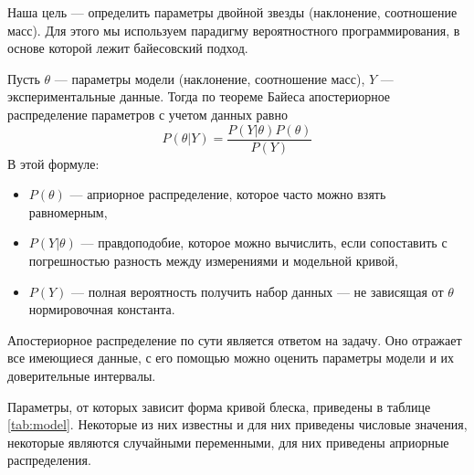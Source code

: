 






Наша цель --- определить параметры двойной звезды (наклонение, соотношение масс). Для этого мы используем парадигму вероятностного программирования, в основе которой лежит байесовский подход.

Пусть $\theta$ --- параметры модели (наклонение, соотношение масс), $Y$ --- экспериментальные данные. Тогда по теореме Байеса апостериорное распределение параметров с учетом данных равно
\begin{equation}
P(\theta | Y) = \frac{P(Y | \theta) P(\theta)}{P(Y)}
\label{eq:bayes}
\end{equation}
В этой формуле:
\begin{itemize}
    \item $P(\theta)$ --- априорное распределение, которое часто можно взять равномерным,
    \item $P(Y | \theta)$ --- правдоподобие, которое можно вычислить, если сопоставить с погрешностью разность между измерениями и модельной кривой,
    \item $P(Y)$ --- полная вероятность получить набор данных --- не зависящая от $\theta$ нормировочная константа.
\end{itemize}

Апостериорное распределение по сути является ответом на задачу. Оно отражает все имеющиеся данные, с его помощью можно оценить параметры модели и их доверительные интервалы.



Параметры, от которых зависит форма кривой блеска, приведены в таблице \ref{tab:model}. Некоторые из них известны и для них приведены числовые значения, некоторые являются случайными переменными, для них приведены априорные распределения.

